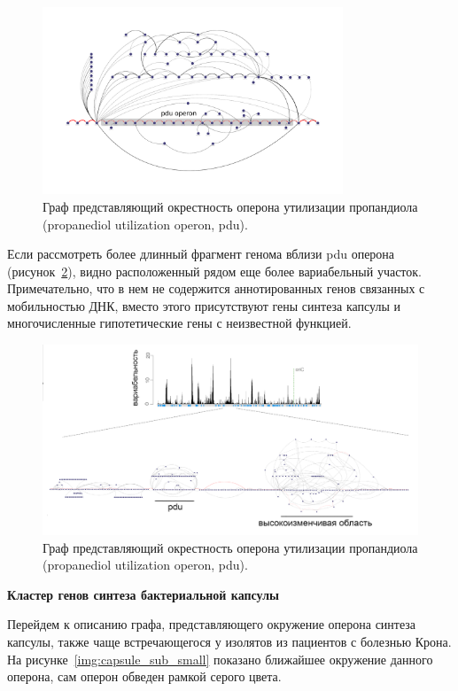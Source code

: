 \begin{figure}[!ht] 
  \center
    \includegraphics[width=0.8\textwidth]{Dissertation/images/subgraphs/pdutail1minw2_v2.pdf}
  \caption{Граф представляющий окрестность оперона утилизации пропандиола (propanediol utilization operon, pdu). }
  \label{img:sub_pdu} 
\end{figure}

Если рассмотреть более длинный фрагмент генома вблизи pdu оперона  (рисунок~\ref{img:pdu_wide}), видно расположенный рядом еще более вариабельный участок. Примечательно, что в нем не содержится аннотированных генов связанных с мобильностью ДНК, вместо этого присутствуют гены синтеза капсулы и многочисленные гипотетические гены с неизвестной функцией. 

\begin{figure}[!ht] 
  \center
    \includegraphics[width=\textwidth]{Dissertation/images/subgraphs/subgraph_largest.png}
  \caption{Граф представляющий окрестность оперона утилизации пропандиола (propanediol utilization operon, pdu). }
  \label{img:pdu_wide} 
\end{figure}

\textbf{Кластер генов синтеза бактериальной капсулы}

Перейдем к описанию графа, представляющего окружение оперона синтеза капсулы, также чаще встречающегося у изолятов из пациентов с болезнью Крона. На рисунке~\ref{img:capsule_sub_small} показано ближайшее окружение данного оперона, сам оперон обведен рамкой серого цвета. 

